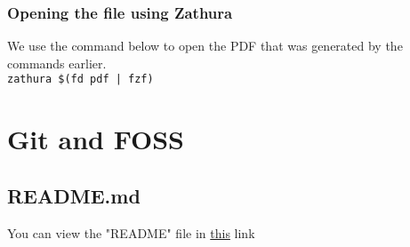 \documentclass[12pt]{article}
\begin{document}
\subsubsection{Opening the file using Zathura}
We use the command below to open the PDF that was generated by the commands earlier.\\
\Large \texttt{zathura \$(fd pdf | fzf)}

\section{Git and FOSS}
\subsection{README.md}
You can view the "README" file in \href{https://github.com/sarbaz14/latex/blob/master/README.md}{this} link
\end{document}
